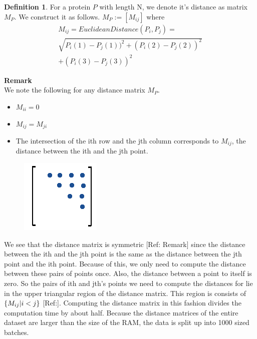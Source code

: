 \documentclass[12pt, a4paper, twocolumn, fullpage]{article}
\theoremstyle{plain}
\theoremstyle{definition}
\newtheorem{defn}{Definition}[section]
\theoremstyle{remark}
\begin{document}
	
\begin{defn}
	For a protein $P$ with length N, we denote it's distance as matrix $M_{P}$.
	We construct it as follows.
	$ M_{P} := [M_{ij}] $ where 
	\begin{multline*}
	M_{ij} = Euclidean Distance(P_i, P_j) = \\ \sqrt{P_i(1)-P_j(1))^2+(P_i(2)-P_j(2))^2} \\ +(P_i(3)-P_j(3))^2
	\end{multline*}
\end{defn}

\noindent
\textbf{Remark}
\\
	We note the following for any distance matrix $M_{P}$.
	\begin{itemize}
		\item $M_{ii} = 0$
		\item $M_{ij} = M_{ji}$
		\item The intersection of the ith row and the jth column corresponds to $M_{ij}$, the distance between the ith and the jth point.
	\end{itemize}
	
\begin{figure}[h]
	\includegraphics[width=\linewidth]{uptry.png}
	\caption{}
	\label{fig:uptry}
\end{figure}
	

We see that the distance matrix is symmetric [Ref: Remark] since the distance between the ith and the jth point is the same as the distance between the jth point and the ith point. Because of this, we only need to compute the distance between these pairs of points once. Also, the distance between a point to itself is zero. So the pairs of ith and jth's points we need to compute the distances for lie in the upper triangular region of the distance matrix. This region is consists of $\{ M_{ij} \space | \space i<j \}$ [Ref:]. Computing the distance matrix in this fashion divides the computation time by about half. Because the distance matrices of the entire dataset are larger than the size of the RAM, the data is split up into 1000 sized batches. 
\end{document}

